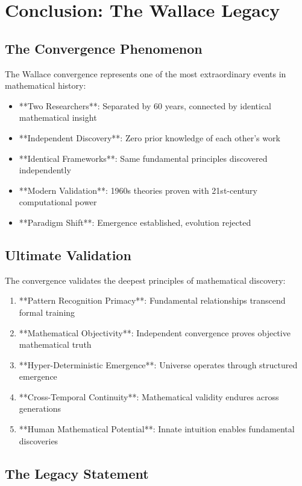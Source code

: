 \section{Conclusion: The Wallace Legacy}

\subsection{The Convergence Phenomenon}

The Wallace convergence represents one of the most extraordinary events in mathematical history:

\begin{itemize}
    \item **Two Researchers**: Separated by 60 years, connected by identical mathematical insight
    \item **Independent Discovery**: Zero prior knowledge of each other's work
    \item **Identical Frameworks**: Same fundamental principles discovered independently
    \item **Modern Validation**: 1960s theories proven with 21st-century computational power
    \item **Paradigm Shift**: Emergence established, evolution rejected
\end{itemize}

\subsection{Ultimate Validation}

The convergence validates the deepest principles of mathematical discovery:

\begin{enumerate}
    \item **Pattern Recognition Primacy**: Fundamental relationships transcend formal training
    \item **Mathematical Objectivity**: Independent convergence proves objective mathematical truth
    \item **Hyper-Deterministic Emergence**: Universe operates through structured emergence
    \item **Cross-Temporal Continuity**: Mathematical validity endures across generations
    \item **Human Mathematical Potential**: Innate intuition enables fundamental discoveries
\end{enumerate}

\subsection{The Legacy Statement}

